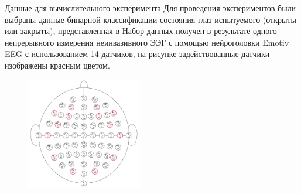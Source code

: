 \documentclass[9pt,pdf]{beamer} %
\begin{document}
\begin{frame}{Данные для вычислительного эксперимента}
Для проведения экспериментов были выбраны данные бинарной классификации состояния глаз испытуемого (открыты или закрыты), представленная в \cite{misc_eeg_eye_state_264}
Набор данных получен в результате одного непрерывного измерения неинвазивного ЭЭГ с помощью нейроголовки Emotiv EEG с использованием 14 датчиков, на рисунке задействованные датчики изображены красным цветом. 
\begin{figure}[h]
	\centering
	\includegraphics[width=0.45\textwidth]{64_channel_sharbrough.pdf}
\end{figure}
\end{frame}
\end{document}
